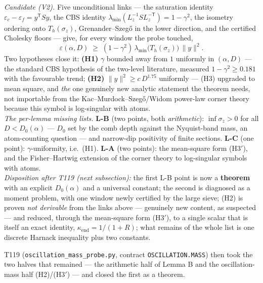 \documentclass[11pt,a4paper]{article}
\begin{document}
\begin{keybox}
\emph{Candidate (V2).} Five unconditional links --- the saturation identity
$\varepsilon_c-\varepsilon_f=y^{\mathsf T}Sy$, the CBS identity
$\lambda_{\min}(L_z^{-1}SL_z^{-\mathsf T})=1-\gamma^2$, the isometry ordering onto
$T_h(\sigma_z)$, Grenander--Szeg\H{o} in the lower direction, and the certified Cholesky floors
--- give, for every window the probe touched,
\[
\varepsilon(\alpha,D)\;\ge\;(1-\gamma^2)\,\lambda_{\min}\!\big(T_h(\sigma_z)\big)\,\|y\|^2 .
\]
Two hypotheses close it: \textbf{(H1)} $\gamma$ bounded away from $1$ uniformly in $(\alpha,D)$
--- the standard CBS hypothesis of the two-level literature, measured $1-\gamma^2\ge0.181$ with
the favourable trend; \textbf{(H2)} $\|y\|^2\ge c\,D^{1.75}$ uniformly --- (H3) upgraded to
mean square, and \emph{the} one genuinely new analytic statement the theorem needs, not
importable from the Kac--Murdock--Szeg\H{o}/Widom power-law corner theory because this symbol
is log-singular with atoms.\\[3pt]
\emph{The per-lemma missing lists.} \textbf{L-B} (two points, both \emph{arithmetic}):
$\inf\sigma_z>0$ for all $D<D_0(\alpha)$ --- $D_0$ set by the comb depth against the
Nyquist-band mass, an atom-counting question --- and narrow-dip positivity of finite sections.
\textbf{L-C} (one point): $\gamma$-uniformity, i.e.\ (H1). \textbf{L-A} (two points): the
mean-square form (H3$'$), and the Fisher--Hartwig extension of the corner theory to
log-singular symbols with atoms.\\[3pt]
\emph{Disposition after T119 (next subsection):} the first L-B point is now a \textbf{theorem}
with an explicit $D_0(\alpha)$ and a universal constant; the second is diagnosed as a moment
problem, with one window newly certified by the large sieve; (H2) is proven \emph{not
derivable} from the links above --- genuinely new content, as suspected --- and reduced,
through the mean-square form (H3$'$), to a single scalar that is itself an exact identity,
$\kappa_{\mathrm{end}}=1/(1+R)$; what remains of the whole list is one discrete Harnack
inequality plus two constants.
\end{keybox}

\noindent T119 (\texttt{oscillation\_mass\_probe.py}, contract \texttt{OSCILLATION.MASS}) then
took the two halves that remained --- the arithmetic half of Lemma B and the oscillation-mass
half (H2)/(H3$'$) --- and closed the first as a theorem.
\end{document}
